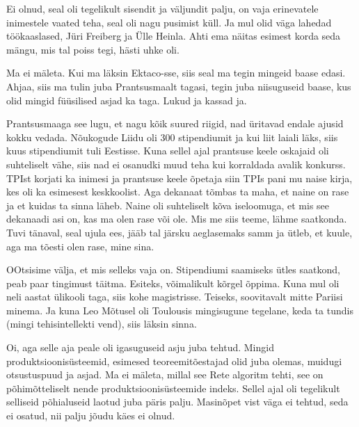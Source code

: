 Ei olnud, seal oli tegelikult sisendit ja väljundit palju, on vaja  erinevatele inimestele vaated teha, seal oli nagu  pusimist küll. Ja mul olid väga lahedad töökaaslased, Jüri Freiberg ja  Ülle Heinla. Ahti ema näitas esimest korda seda mängu, mis tal poiss tegi, hästi uhke oli. 


Ma ei mäleta. Kui ma läksin Ektaco-sse, siis seal ma tegin mingeid baase edasi. Ahjaa, siis ma tulin juba Prantsusmaalt tagasi, tegin juba niisuguseid baase, kus olid mingid füüsilised asjad ka taga. Lukud ja kassad ja.


Prantsusmaaga see lugu, et nagu kõik suured riigid, nad üritavad endale ajusid kokku vedada. Nõukogude Liidu oli 300 stipendiumit ja kui liit laiali läks, siis kuus stipendiumit tuli Eestisse. Kuna sellel ajal prantsuse keele  oskajaid oli suhteliselt vähe, siis nad ei osanudki muud teha kui korraldada avalik konkurss. TPIst korjati ka inimesi ja prantsuse keele õpetaja siin TPIs pani mu naise kirja, kes oli ka esimesest keskkoolist. Aga dekanaat tõmbas ta maha, et naine on rase ja et kuidas ta sinna läheb. Naine oli suhteliselt kõva iseloomuga, et mis see  dekanaadi asi on, kas ma olen rase või ole. Mis me siis teeme, lähme saatkonda. Tuvi tänaval, seal ujula ees, jääb tal järsku aeglasemaks  samm ja ütleb, et kuule, aga ma tõesti olen rase, mine sina.

OOtsisime välja, et mis selleks vaja on. Stipendiumi saamiseks ütles saatkond, peab paar tingimust täitma. Esiteks, võimalikult kõrgel õppima. Kuna mul oli neli aastat ülikooli taga, siis kohe magistrisse. Teiseks, soovitavalt  mitte Pariisi minema. Ja kuna Leo Mõtusel oli Toulousis mingisugune tegelane, keda ta tundis (mingi tehisintellekti vend),  siis läksin sinna.
                

Oi, aga selle aja peale oli igasuguseid asju juba  tehtud. Mingid produktsioonisüsteemid,  esimesed teoreemitõestajad olid juba olemas, muidugi  otsustuspuud ja asjad. Ma ei mäleta, millal see Rete  algoritm tehti, see on põhimõtteliselt nende produktsioonisüsteemide indeks. Sellel ajal oli tegelikult selliseid põhialuseid laotud juba päris palju. Masinõpet vist väga ei tehtud, seda ei osatud, nii palju jõudu käes ei olnud.
                 
